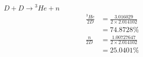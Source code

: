 \documentclass{article}
\begin{document}
\begin{itemize}
\begin{itemize}
\begin{itemize}
\begin{align*}
            \end{align*}
            \item [\(D+D\rightarrow {}^3He + n\)]
            \begin{align*}
                \frac{{}^3He}{2D} &= \frac{3.016029}{2\times 2.014102}\\
                &=74.8728 \%\\
                \frac{n}{2D} &= \frac{1.00727647}{2\times 2.014102}\\
                &=25.0401  \%
            \end{align*}
        \end{itemize}
    \end{itemize}
\end{itemize}
\end{document}
